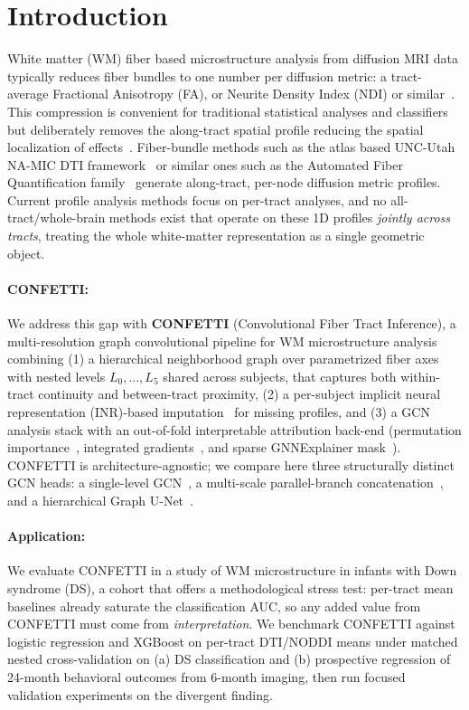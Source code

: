 \documentclass[runningheads]{llncs}
\begin{document}
\section{Introduction}

White matter (WM) fiber based microstructure analysis from diffusion MRI data typically reduces 
fiber bundles to one number per diffusion metric: a tract-average
Fractional Anisotropy (FA), or Neurite Density Index (NDI) or similar~\cite{ref_zhang}.
This compression is convenient for traditional statistical analyses and
classifiers~\cite{ref_chen,ref_breiman} but
deliberately removes the along-tract spatial profile reducing the spatial localization of effects~\cite{ref_yeatman,ref_cohort}.
Fiber-bundle methods such as the atlas based
UNC-Utah NA-MIC DTI framework~\cite{ref_verde2014}
or similar ones such as the Automated Fiber Quantification
family~\cite{ref_yeatman} generate along-tract, per-node diffusion metric profiles. Current profile analysis methods focus on per-tract analyses, and no all-tract/whole-brain methods exist that operate on these 1D profiles
\emph{jointly across tracts}, treating the whole white-matter representation
as a single geometric object.

\paragraph{CONFETTI:}
We address this gap with \textbf{CONFETTI} (Convolutional Fiber Tract
Inference), a multi-resolution graph convolutional pipeline for
WM microstructure analysis combining (1) a hierarchical
neighborhood graph over parametrized fiber axes with nested levels
$L_0,\dots,L_5$ shared across subjects, that captures both within-tract
continuity and between-tract proximity, (2) a per-subject
implicit neural representation (INR)-based imputation~\cite{ref_sitzmann} for missing
profiles, and (3) a GCN analysis stack with an out-of-fold
interpretable attribution back-end (permutation
importance~\cite{ref_breiman}, integrated gradients~\cite{ref_sundararajan}, and
sparse GNNExplainer mask~\cite{ref_ying}). CONFETTI is
architecture-agnostic; we compare here three structurally distinct
GCN heads: a single-level GCN~\cite{ref_kipf}, a multi-scale parallel-branch
concatenation~\cite{ref_hamilton,ref_velickovic}, and a hierarchical Graph
U-Net~\cite{ref_gao}.

\paragraph{Application:}
We evaluate CONFETTI in a study of WM microstructure in
infants with Down syndrome (DS), a cohort that offers a methodological
stress test: per-tract mean baselines already saturate the classification
AUC, so any added value from CONFETTI must come from
\emph{interpretation}. We benchmark CONFETTI against logistic regression
and XGBoost on per-tract DTI/NODDI means under matched nested
cross-validation on (a) DS classification and (b) prospective regression
of 24-month behavioral outcomes from 6-month
imaging, then run focused validation experiments on the divergent finding.
\end{document}
